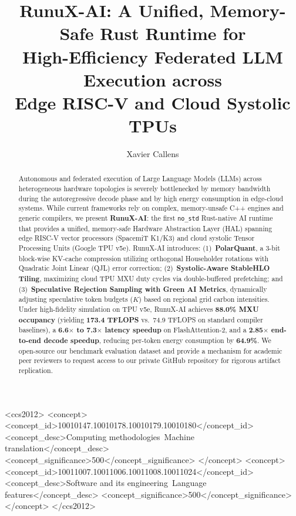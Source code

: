 \documentclass[sigconf,nonacm=false]{acmart}
\begin{document}
\title{RunuX-AI: A Unified, Memory-Safe Rust Runtime for\\High-Efficiency Federated LLM Execution across\\Edge RISC-V and Cloud Systolic TPUs}

\author{Xavier Callens}

\begin{abstract}
Autonomous and federated execution of Large Language Models (LLMs) across heterogeneous hardware topologies is severely bottlenecked by memory bandwidth during the autoregressive decode phase and by high energy consumption in edge-cloud systems. While current frameworks rely on complex, memory-unsafe C++ engines and generic compilers, we present \textbf{RunuX-AI}: the first \texttt{no\_std} Rust-native AI runtime that provides a unified, memory-safe Hardware Abstraction Layer (HAL) spanning edge RISC-V vector processors (SpacemiT K1/K3) and cloud systolic Tensor Processing Units (Google TPU v5e). RunuX-AI introduces: (1)~{\textbf{PolarQuant}}, a 3-bit block-wise KV-cache compression utilizing orthogonal Householder rotations with Quadratic Joint Linear (QJL) error correction; (2)~{\textbf{Systolic-Aware StableHLO Tiling}}, maximizing cloud TPU MXU duty cycles via double-buffered prefetching; and (3)~{\textbf{Speculative Rejection Sampling with Green AI Metrics}}, dynamically adjusting speculative token budgets ($K$) based on regional grid carbon intensities. Under high-fidelity simulation on TPU v5e, RunuX-AI achieves \textbf{88.0\% MXU occupancy} (yielding \textbf{173.4 TFLOPS} vs.\ 74.9 TFLOPS on standard compiler baselines), a \textbf{6.6$\times$ to 7.3$\times$ latency speedup} on FlashAttention-2, and a \textbf{2.85$\times$ end-to-end decode speedup}, reducing per-token energy consumption by \textbf{64.9\%}. We open-source our benchmark evaluation dataset and provide a mechanism for academic peer reviewers to request access to our private GitHub repository for rigorous artifact replication.
\end{abstract}

\begin{CCSXML}
<ccs2012>
<concept>
<concept_id>10010147.10010178.10010179.10010180</concept_id>
<concept_desc>Computing methodologies~Machine translation</concept_desc>
<concept_significance>500</concept_significance>
</concept>
<concept>
<concept_id>10011007.10011006.10011008.10011024</concept_id>
<concept_desc>Software and its engineering~Language features</concept_desc>
<concept_significance>500</concept_significance>
</concept>
</ccs2012>
\end{CCSXML}
\end{document}
